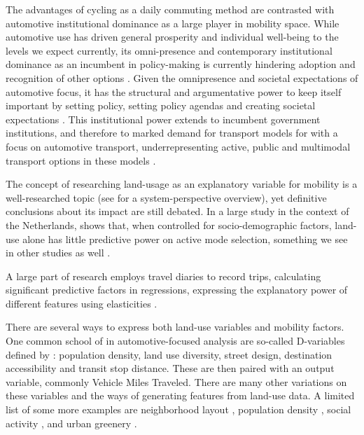 \documentclass[sigconf, natbib=false, nonacm]{acmart}
\begin{document}
    The advantages of cycling as a daily commuting method are contrasted with automotive institutional dominance as a large player in mobility space. While automotive use has driven general prosperity and individual well-being to the levels we expect currently, its omni-presence and contemporary institutional dominance as an incumbent in policy-making is currently hindering adoption and recognition of other options \parencite{smink_keeping_2015, kanger_user-made_2016}. Given the omnipresence and societal expectations of automotive focus, it has the structural and argumentative power to keep itself important by setting policy, setting policy agendas and creating societal expectations \cite{brisbois_shifting_2020}. This institutional power extends to incumbent government institutions, and therefore to marked demand for transport models for with a focus on automotive transport, underrepresenting active, public and multimodal transport options in these models \parencite{te_brommelstroet_role_2011, keblowski_all_2018}. 
    
    The concept of researching land-usage as an explanatory variable for mobility is a well-researched topic (see \cite{bertolini_planning_2017} for a system-perspective overview), yet definitive conclusions about its impact are still debated. In a large study in the context of the Netherlands, \textcite{snellen_urban_2001} shows that, when controlled for socio-demographic factors, land-use alone has little predictive power on active mode selection, something we see in other studies as well \parencite{nello-deakin_assessing_2019}. 
    
    A large part of research employs travel diaries to record trips, calculating significant predictive factors in regressions, expressing the explanatory power of different features using elasticities \parencite{aditjandra_influence_2013, handy_correlation_2005}. 
    
    There are several ways to express both land-use variables and mobility factors. One common school of in automotive-focused analysis are so-called D-variables defined by \textcite{cervero_travel_1997}: population density, land use diversity, street design, destination accessibility and transit stop distance. These are then paired with an output variable, commonly Vehicle Miles Traveled. There are many other variations on these variables and the ways of generating features from land-use data. A limited list of some more examples are neighborhood layout \parencite{hamidi_longitudinal_2014, nello-deakin_assessing_2019, nam_compact_2012, stevens_does_2017}, population density \parencite{gim_meta-analysis_2012, song_comparing_2013}, social activity \parencite{naess_accessibility_2006, bergefurt_loneliness_2019}, and urban greenery \parencite{yang_walk_2021, ewing_streetscape_2016}.
    
\end{document}
